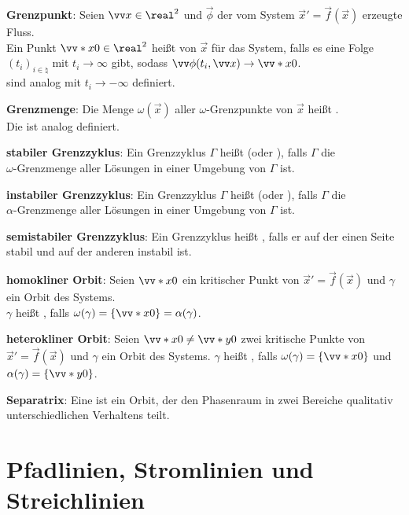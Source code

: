 \textbf{Grenzpunkt}:
Seien $\vec{x} \in \real^2$ und $\vec{\phi}$ der vom System $\vec{x}' = \vec{f}(\vec{x})$
erzeugte Fluss.\\
Ein Punkt $\vecs{x}{0} \in \real^2$ heißt  von $\vec{x}$
für das System, falls es eine Folge $(t_i)_{i \in \natural}$
mit $t_i \to \infty$ gibt, sodass $\vec{\phi}(t_i, \vec{x}) \to \vecs{x}{0}$.\\
 sind analog mit $t_i \to -\infty$ definiert.

\textbf{Grenzmenge}:
Die Menge $\omega(\vec{x})$ aller $\omega$-Grenzpunkte von $\vec{x}$ heißt
.\\
Die  ist analog definiert.

\linie

\textbf{stabiler Grenzzyklus}:
Ein Grenzzyklus $\Gamma$ heißt 
(oder ), falls $\Gamma$ die\\
$\omega$-Grenzmenge aller Lösungen in einer Umgebung von $\Gamma$ ist.

\textbf{instabiler Grenzzyklus}:
Ein Grenzzyklus $\Gamma$ heißt 
(oder ), falls $\Gamma$ die\\
$\alpha$-Grenzmenge aller Lösungen in einer Umgebung von $\Gamma$ ist.

\textbf{semistabiler Grenzzyklus}:
Ein Grenzzyklus heißt , falls er auf der einen Seite stabil und auf der
anderen instabil ist.

\linie

\textbf{homokliner Orbit}:
Seien $\vecs{x}{0}$ ein kritischer Punkt von $\vec{x}' = \vec{f}(\vec{x})$
und $\gamma$ ein Orbit des Systems.\\
$\gamma$ heißt , falls $\omega(\gamma) = \{\vecs{x}{0}\} = \alpha(\gamma)$.

\textbf{heterokliner Orbit}:
Seien $\vecs{x}{0} \not= \vecs{y}{0}$ zwei kritische Punkte von $\vec{x}' = \vec{f}(\vec{x})$
und $\gamma$ ein Orbit des Systems.
$\gamma$ heißt , falls $\omega(\gamma) = \{\vecs{x}{0}\}$
und $\alpha(\gamma) = \{\vecs{y}{0}\}$.

\textbf{Separatrix}:
Eine  ist ein Orbit, der den Phasenraum in zwei Bereiche
qualitativ unterschiedlichen Verhaltens teilt.

\pagebreak

\section{%
    Pfadlinien, Stromlinien und Streichlinien%
}

